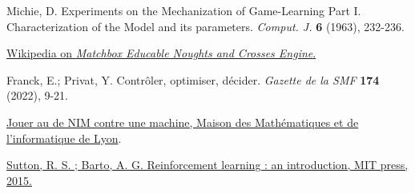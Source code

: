 \documentclass[a4paper,12pt]{article}
\begin{document}
\begin{thebibliography}{100} \label{ruxe9fuxe9rences}

Michie, D. Experiments on the Mechanization of Game-Learning Part I.
  Characterization of the Model and its parameters. 
  \emph{Comput. J.} \textbf{6} (1963), 232-236.

\href{https://en.wikipedia.org/wiki/Matchbox_Educable_Noughts_and_Crosses_Engine}{Wikipedia on \emph{Matchbox Educable Noughts and Crosses Engine}.}
  
Franck, E.; Privat, Y. Contrôler, optimiser, décider. \emph{Gazette de la SMF} \textbf{174} (2022), 9-21.
  
\href{https://mmi-lyon.fr/jouer-au-jeu-de-nim-contre-une-machine}{Jouer au de NIM contre une machine, Maison des Mathématiques et de l'informatique de Lyon}.
  
\href{https://web.stanford.edu/class/psych209/Readings/SuttonBartoIPRLBook2ndEd.pdf}{Sutton,  R. S. ; Barto, A. G. Reinforcement learning : an introduction, MIT press, 2015.}
\end{thebibliography}
\end{document}
